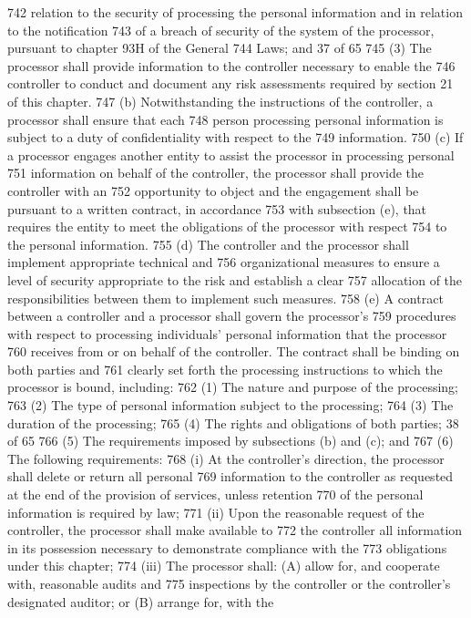 742 relation to the security of processing the personal information and in relation to the notification
743 of a breach of security of the system of the processor, pursuant to chapter 93H of the General
744 Laws; and
37 of 65
745 (3) The processor shall provide information to the controller necessary to enable the
746 controller to conduct and document any risk assessments required by section 21 of this chapter.
747 (b) Notwithstanding the instructions of the controller, a processor shall ensure that each
748 person processing personal information is subject to a duty of confidentiality with respect to the
749 information.
750 (c) If a processor engages another entity to assist the processor in processing personal
751 information on behalf of the controller, the processor shall provide the controller with an
752 opportunity to object and the engagement shall be pursuant to a written contract, in accordance
753 with subsection (e), that requires the entity to meet the obligations of the processor with respect
754 to the personal information.
755 (d) The controller and the processor shall implement appropriate technical and
756 organizational measures to ensure a level of security appropriate to the risk and establish a clear
757 allocation of the responsibilities between them to implement such measures.
758 (e) A contract between a controller and a processor shall govern the processor’s
759 procedures with respect to processing individuals’ personal information that the processor
760 receives from or on behalf of the controller. The contract shall be binding on both parties and
761 clearly set forth the processing instructions to which the processor is bound, including:
762 (1) The nature and purpose of the processing;
763 (2) The type of personal information subject to the processing;
764 (3) The duration of the processing;
765 (4) The rights and obligations of both parties;
38 of 65
766 (5) The requirements imposed by subsections (b) and (c); and
767 (6) The following requirements:
768 (i) At the controller’s direction, the processor shall delete or return all personal
769 information to the controller as requested at the end of the provision of services, unless retention
770 of the personal information is required by law;
771 (ii) Upon the reasonable request of the controller, the processor shall make available to
772 the controller all information in its possession necessary to demonstrate compliance with the
773 obligations under this chapter;
774 (iii) The processor shall: (A) allow for, and cooperate with, reasonable audits and
775 inspections by the controller or the controller’s designated auditor; or (B) arrange for, with the
